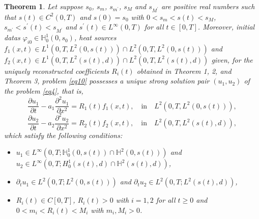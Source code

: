 \documentclass[preprint,12pt,authoryear]{elsarticle}
\newtheorem{theorem}{Theorem}
\begin{document}
\begin{theorem}\label{thm5}
Let suppose $s_0$, $s_m$, $s_{m^{\prime}}$, $s_M$ and $s_{M^{\prime}}$ are positive real numbers such that $s(t)\in C^2(0,T)$ and $s(0)=s_0$ with $0<s_m<s(t)<s_M$, $s_{m^{\prime}}<s^{\prime}(t)<s_{M^{\prime}}$ and $s^{\prime}(t)\in L^{\infty}(0,T)$ for all $t\in[0,T]$. Moreover, initial datas $\varphi_{i0}\in \mathbb{H}_0^1(0,s_0)$, heat sources $f_1(x,t)\in L^1(0,
T,L^2(0,s(t)))\cap L^2(0,T,L^2(0,s(t)))$ and $f_2(x,t)\in L^1(0,
T,L^2(s(t),d))\cap L^2(0,T,L^2(s(t),d))$ given, for the uniquely reconstructed coefficients $R_i(t)$ obtained in Theorem 1, 2, and Theorem 3, problem \eqref{eq10} possesses a unique strong solution pair $(u_1,u_2)$ of the problem \eqref{eq4}, that is, 
$$\frac{\partial u_1}{\partial t}-a_1\frac{\partial^2 u_1}{\partial x^2}=R_1(t)f_1(x,t),\quad\text{in}\quad L^2(0,T,L^2(0,s(t))),$$
$$\frac{\partial u_2}{\partial t}-a_2\frac{\partial^2 u_2}{\partial x^2}=R_2(t)f_2(x,t),\quad\text{in}\quad L^2(0,T,L^2(s(t),d)),$$
which satisfy the following conditions:
\begin{itemize}
    \item[a)] $u_1\in L^{\infty}(0,T; \mathbb{H}_0^1(0,s(t))\cap \mathbb{H}^2(0,s(t)))$ and $u_2\in L^{\infty}(0,T; H_0^1(s(t),d)\cap \mathbb{H}^2(s(t),d))$,
    \item[b)] $\partial_t u_1\in L^2(0,T; L^2(0,s(t)))$ and $\partial_t u_2\in L^2(0,T; L^2(s(t),d))$,
    \item[c)] $R_i(t)\in C[0,T]$, $R_i(t)>0$ with $i=1,2$ for all $t\geq 0$ and $0<m_i<R_i(t)<M_i$ with $m_i,M_i>0$.  
\end{itemize}
    
\end{theorem}
\end{document}

